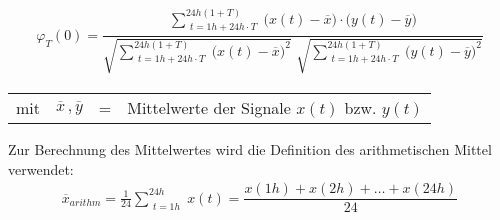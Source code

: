 \documentclass[fontsize=11pt, twoside, a4paper]{scrartcl}
\begin{document}
\begin{align}
\varphi_{T} (0) = \dfrac{\sum_{\substack{t=1h+24h\cdot T}}^{24h(1+T)} \bigl( x(t) - \overline{x} \bigr) \cdot \bigl( y(t) - \overline{y} \bigr)}{\sqrt{\sum_{\substack{t=1h+24h\cdot T}}^{24h(1+T)} \bigl( x(t) - \overline{x} \bigr)^{2}} \,\, \sqrt{\sum_{\substack{t=1h+24h\cdot T}}^{24h(1+T)} \bigl( y(t) - \overline{y} \bigr)^{2}}}
\label{KreuzKorrelation}
\end{align}

\begin{table}[H]
\begin{tabular}{rccl}
mit  & $\overline{x} \, , \overline{y}$ & = & Mittelwerte der Signale $x(t)$ bzw. $y(t)$\\
\end{tabular}
\end{table}
Zur Berechnung des Mittelwertes wird die Definition des arithmetischen Mittel \cite{TaschenbuchMathematik} verwendet:
\begin{align}
\overline{x}_{arithm} = \frac{1}{24} \sum_{\substack{t=1h}}^{24h} x(t) = \dfrac{x(1h)+x(2h)+ \ldots +x(24h)}{24}
\label{Mittelwert}
\end{align}
\end{document}
